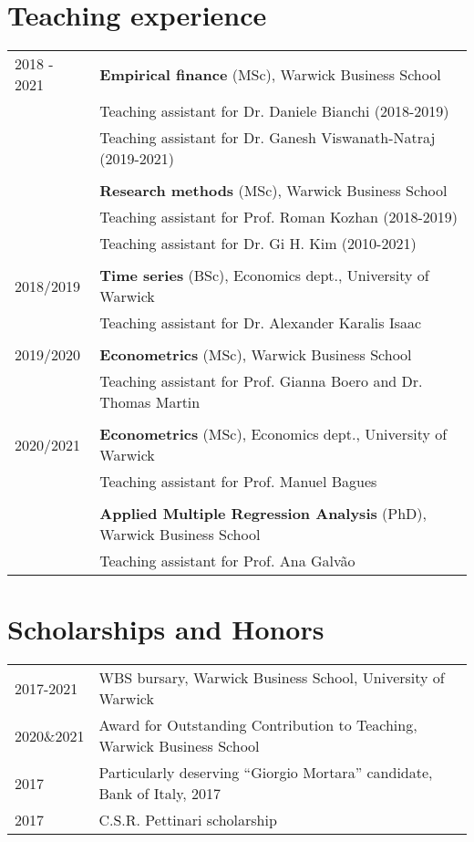 \documentclass[a4paper,12pt]{article}
\begin{document}
\section{Teaching experience}
\begin{tabular}{ll}
2018 - 2021& \textbf{Empirical finance} (MSc), Warwick Business School \\
           & Teaching assistant for Dr. Daniele Bianchi (2018-2019)\\
           & Teaching assistant for Dr. Ganesh Viswanath-Natraj (2019-2021) \\
           & \\[.25em]
          & \textbf{Research methods} (MSc), Warwick Business School \\
          & Teaching assistant for Prof. Roman Kozhan (2018-2019)\\
          & Teaching assistant for Dr. Gi H. Kim (2010-2021)\\
          & \\[.25em]
2018/2019 & \textbf{Time series} (BSc), Economics dept., University of Warwick \\
          & \multicolumn{1}{l}{Teaching assistant for Dr. Alexander Karalis Isaac} \\
          & \\[.25em]
2019/2020 & \textbf{Econometrics} (MSc), Warwick Business School \\
          & \multicolumn{1}{l}{Teaching assistant for Prof. Gianna Boero and Dr. Thomas Martin }\\
          & \\[.25em]
2020/2021 & \textbf{Econometrics} (MSc), Economics dept.,  University of Warwick \\
          & \multicolumn{1}{l}{Teaching assistant for Prof. Manuel Bagues}\\
          & \\[.25em]
          & \textbf{Applied Multiple Regression Analysis} (PhD), Warwick Business School \\
          & \multicolumn{1}{l}{Teaching assistant for Prof. Ana Galv\~ao}\\
\end{tabular}

\section{Scholarships and Honors}
\begin{tabular}{ll}
2017-2021 & WBS bursary, Warwick Business School, University of Warwick\\
2020\&2021 & Award for Outstanding Contribution to Teaching, Warwick Business School\\
2017 & Particularly deserving “Giorgio Mortara” candidate, Bank of Italy, 2017\\
2017 & C.S.R. Pettinari scholarship\\
\end{tabular}
\newpage
\end{document}
